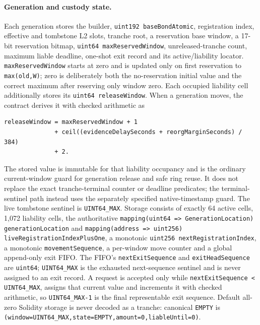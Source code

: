 \documentclass[a4paper,11pt]{article}
\newcommand{\code}[1]{\nolinkurl{#1}}
\begin{document}
\paragraph{Generation and custody state.}
Each generation stores the builder, \code{uint192 baseBondAtomic}, registration
index, effective and tombstone L2 slots, tranche root, a reservation base
window, a 17-bit reservation bitmap, \code{uint64 maxReservedWindow},
unreleased-tranche count, maximum liable deadline, one-shot exit record and its
active/liability locator.  \code{maxReservedWindow} starts at zero and is
updated only on first reservation to \code{max(old,W)}; zero is deliberately
both the no-reservation initial value and the correct maximum after reserving
only window zero.  Each occupied liability cell additionally stores its
\code{uint64 releaseWindow}.  When a generation moves, the contract derives it
with checked arithmetic as
\begin{verbatim}
releaseWindow = maxReservedWindow + 1
              + ceil((evidenceDelaySeconds + reorgMarginSeconds) / 384)
              + 2.
\end{verbatim}
The stored value is immutable for that liability occupancy and is the ordinary
current-window guard for generation release and safe ring reuse.  It does not
replace the exact tranche-terminal counter or deadline predicates; the
terminal-sentinel path instead uses the separately specified native-timestamp
guard.  The live
tombstone sentinel is \code{UINT64_MAX}.  Storage consists of exactly 64 active
cells, 1,072 liability cells, the authoritative
\code{mapping(uint64 => GenerationLocation) generationLocation} and
\code{mapping(address => uint256) liveRegistrationIndexPlusOne}, a
monotonic \code{uint256 nextRegistrationIndex}, a monotonic
\code{movementSequence}, a per-window move counter and a global append-only exit
FIFO.  The FIFO's \code{nextExitSequence} and \code{exitHeadSequence} are
\code{uint64}; \code{UINT64_MAX} is the exhausted next-sequence sentinel and is
never assigned to an exit record.  A request is accepted only while
\code{nextExitSequence < UINT64_MAX}, assigns that current value and increments
it with checked arithmetic, so \code{UINT64_MAX-1} is the final representable
exit sequence.  Default all-zero Solidity storage is never decoded as a tranche:
canonical \code{EMPTY} is
\code{(window=UINT64_MAX,state=EMPTY,amount=0,liableUntil=0)}.
\end{document}
